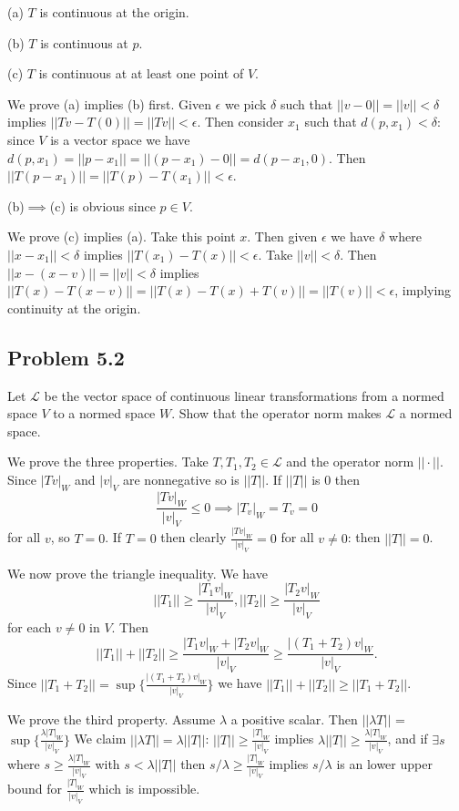 \documentclass{amsart}
\begin{document}
(a) \( T \) is continuous at the origin.

(b) \( T \) is continuous at \( p \).

(c) \( T \) is continuous at at least one point of \( V \).

\medskip \noindent We prove (a) implies (b) first. Given $\epsilon$ we pick $\delta$ such that $||v-0||=||v||<\delta$ implies $||Tv-T(0)||=||Tv||<\epsilon$. Then
consider $x_1$ such that $d(p, x_1)<\delta$: since $V$ is a vector space we have 
$d(p, x_1)=||p-x_1||=||(p-x_1)-0||=d(p-x_1, 0)$. Then $||T(p-x_1)||=||T(p)-T(x_1)||<\epsilon$.

\medskip \noindent (b)$\implies$(c) is obvious since $p\in V$.

\medskip \noindent We prove (c) implies (a). Take this point $x$. Then given $\epsilon$ we have $\delta$ where
$||x-x_1||<\delta$ implies $||T(x_1)-T(x)||<\epsilon$. Take $||v||<\delta$. Then $||x-(x-v)||=||v||<\delta$
implies $||T(x)-T(x-v)||=||T(x)-T(x)+T(v)||=||T(v)||<\epsilon$, implying continuity at the origin.

\newpage

\subsection*{Problem 5.2} Let \( \mathcal{L} \) be the vector space of continuous 
linear transformations from a normed space \( V \) to a normed space \( W \). Show that 
the operator norm makes \( \mathcal{L} \) a normed space.

\medskip \noindent We prove the three properties. Take $T, T_1, T_2\in\mathcal{L}$ and the operator norm
$||\cdot||$. Since $|Tv|_W$ and $|v|_V$ are nonnegative so is $||T||$. If $||T||$ is $0$ then 
\[\frac{|Tv|_W}{|v|_V}\leq 0\implies |T_v|_W=T_v=0\] for all $v$, so $T=0$. If $T=0$ then clearly 
$\frac{|Tv|_W}{|v|_V}=0$ for all $v\neq 0$: then $||T||=0$. 

\medskip \noindent We now prove the triangle inequality. We have 
\[||T_1||\geq\frac{|T_1v|_W}{|v|_V}, ||T_2||\geq\frac{|T_2v|_W}{|v|_V}\] for each $v\neq 0$ in $V$.
Then \[||T_1||+||T_2||\geq\frac{|T_1v|_W+|T_2v|_W}{|v|_V}\geq\frac{|(T_1+T_2)v|_W}{|v|_V}.\]
Since $||T_1+T_2||=\sup\{\frac{|(T_1+T_2)v|_W}{|v|_V}\}$ we have $||T_1||+||T_2||\geq||T_1+T_2||$.

\medskip \noindent We prove the third property. Assume $\lambda$ a positive scalar.
Then $||\lambda T||$ = $\sup\{\frac{\lambda|T|_W}{|v|_V}\}$ We claim $||\lambda T||=\lambda||T||$:
$||T||\geq\frac{|T|_W}{|v|_V}$ implies $\lambda||T||\geq\frac{\lambda|T|_W}{|v|_V}$, and if $\exists s$ where $s\geq\frac{\lambda|T|_W}{|v|_V}$
with $s<\lambda||T||$ then $s/\lambda\geq\frac{|T|_W}{|v|_V}$ implies $s/\lambda$ is an lower upper bound for $\frac{|T|_W}{|v|_V}$ which is impossible.
\end{document}
